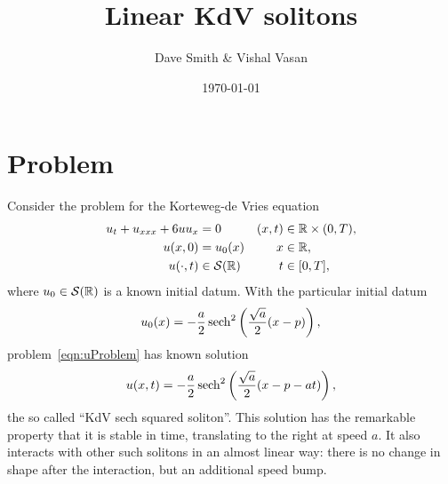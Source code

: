 \documentclass[11pt,reqno,oneside,a4paper]{article}
\author{Dave Smith \& Vishal Vasan}
\title{Linear KdV solitons}
\date{\today}
\begin{document}
\maketitle
\thispagestyle{fancy}

\section{Problem}

Consider the problem for the Korteweg-de Vries equation
\begin{subequations} \label{eqn:uProblem}
\begin{align}
    \label{eqn:uProblem.PDE}
    u_t + u_{xxx} + 6uu_x &= 0 & (x,t) &\in \mathbb R\times(0,T), \\
    \label{eqn:uProblem.InC}
    u(x,0) &= u_0(x) & x &\in\mathbb R, \\
    \label{eqn:uProblem.BC}
    u(\cdot,t) &\in \mathcal{S}(\mathbb R) & t &\in [0,T],
\end{align}
\end{subequations}
where $u_0\in\mathcal{S}(\mathbb R)$ is a known initial datum.
With the particular initial datum
\begin{equation} \label{eqn:u0Soliton}
    u_0(x) = -\frac{a}{2}\operatorname{sech}^2\left(\frac{\sqrt{a}}{2}(x-p)\right),
\end{equation}
problem~\ref{eqn:uProblem} has known solution
\begin{equation} \label{eqn:uSoliton}
    u(x,t) = -\frac{a}{2}\operatorname{sech}^2\left(\frac{\sqrt{a}}{2}(x-p-at)\right),
\end{equation}
the so called ``KdV sech squared soliton''.
This solution has the remarkable property that it is stable in time, translating to the right at speed $a$.
It also interacts with other such solitons in an almost linear way: there is no change in shape after the interaction, but an additional speed bump.
\end{document}

